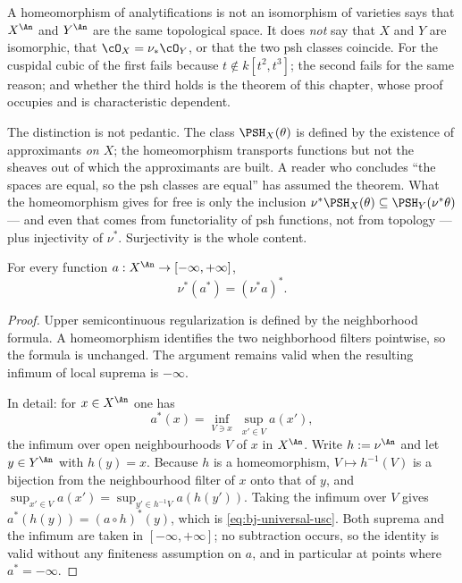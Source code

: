 \begin{warning}{A homeomorphism of analytifications is not an isomorphism of
varieties}
\label{warn:ch43-homeo-not-iso}
 says that $X^{\An}$ and
$Y^{\An}$ are the same topological space.  It does \emph{not} say that
$X$ and $Y$ are isomorphic, that $\cO_X=\nu_*\cO_Y$, or that the two
psh classes coincide.  For the cuspidal cubic of
 the first fails because $t\notin k[t^2,t^3]$; the
second fails for the same reason; and whether the third holds is the
theorem of this chapter, whose proof occupies
 and is characteristic
dependent.

The distinction is not pedantic.  The class $\PSH_X(\theta)$ is defined by
the existence of approximants \emph{on $X$}; the homeomorphism transports
functions but not the sheaves out of which the approximants are built.  A
reader who concludes ``the spaces are equal, so the psh classes are equal''
has assumed the theorem.  What the homeomorphism gives for free is only the
inclusion $\nu^*\PSH_X(\theta)\subseteq\PSH_Y(\nu^*\theta)$ --- and even
that comes from functoriality of psh functions, not from topology --- plus
injectivity of $\nu^*$.  Surjectivity is the whole content.
\end{warning}

\begin{corollary}\label{cor:bj-universal-usc}
For every function $a:X^{\An}\to[-\infty,+\infty]$,
\[
                         \nu^*(a^*)=(\nu^*a)^*.
\tag{43.4}\label{eq:bj-universal-usc}
\]
\end{corollary}

\begin{proof}
Upper semicontinuous regularization is defined by the neighborhood formula.
A homeomorphism identifies the two neighborhood filters pointwise, so the
formula is unchanged.
The argument remains valid when the resulting infimum of local suprema is
$-\infty$.

In detail: for $x\in X^{\An}$ one has
\[
 a^*(x)=\inf_{V\ni x}\ \sup_{x'\in V}a(x'),
\]
the infimum over open neighbourhoods $V$ of $x$ in $X^{\An}$.  Write
$h:=\nu^{\An}$ and let $y\in Y^{\An}$ with $h(y)=x$.  Because $h$ is
a homeomorphism, $V\mapsto h^{-1}(V)$ is a bijection from the
neighbourhood filter of $x$ onto that of $y$, and
$\sup_{x'\in V}a(x')=\sup_{y'\in h^{-1}V}a(h(y'))$.  Taking the infimum
over $V$ gives
$a^*(h(y))=(a\circ h)^*(y)$, which is
\eqref{eq:bj-universal-usc}.  Both suprema and the infimum are taken in
$[-\infty,+\infty]$; no subtraction occurs, so the identity is valid without any
finiteness assumption on $a$, and in particular at points where
$a^*=-\infty$.
\end{proof}

